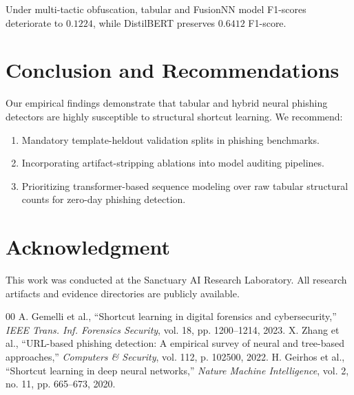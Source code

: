 \documentclass[conference,10pt]{IEEEtran}
\begin{document}
Under multi-tactic obfuscation, tabular and FusionNN model F1-scores deteriorate to $0.1224$, while DistilBERT preserves $0.6412$ F1-score.

\section{Conclusion and Recommendations}
Our empirical findings demonstrate that tabular and hybrid neural phishing detectors are highly susceptible to structural shortcut learning. We recommend:
\begin{enumerate}
    \item Mandatory template-heldout validation splits in phishing benchmarks.
    \item Incorporating artifact-stripping ablations into model auditing pipelines.
    \item Prioritizing transformer-based sequence modeling over raw tabular structural counts for zero-day phishing detection.
\end{enumerate}

\section*{Acknowledgment}
This work was conducted at the Sanctuary AI Research Laboratory. All research artifacts and evidence directories are publicly available.

\begin{thebibliography}{00}
 A. Gemelli et al., ``Shortcut learning in digital forensics and cybersecurity,'' \emph{IEEE Trans. Inf. Forensics Security}, vol. 18, pp. 1200--1214, 2023.
 X. Zhang et al., ``URL-based phishing detection: A empirical survey of neural and tree-based approaches,'' \emph{Computers \& Security}, vol. 112, p. 102500, 2022.
 H. Geirhos et al., ``Shortcut learning in deep neural networks,'' \emph{Nature Machine Intelligence}, vol. 2, no. 11, pp. 665--673, 2020.
\end{thebibliography}
\end{document}
